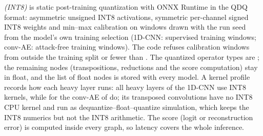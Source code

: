 \emph{\Qint{} (INT8)} is static post-training quantization with ONNX Runtime in the QDQ format: asymmetric unsigned INT8
activations, symmetric per-channel signed INT8 weights and min--max calibration on \CalibWindowsQ{} windows drawn with
the run seed from the model's own training selection (1D-CNN: supervised training windows; conv-AE: attack-free
training windows). The code refuses calibration windows from outside the training split or fewer than
\MinCalibWindowsQ. The quantized operator types are \QOpTypes; the remaining nodes (transpositions, reductions and
the score computation) stay in float, and the list of float nodes is stored with every model. A kernel profile
records how each heavy layer runs: all \HeavyIntCNN{} heavy layers of the 1D-CNN use INT8 kernels, while for the
conv-AE \HeavyIntAE{} of \HeavyAE{} do; its \HeavySimAE{} transposed convolutions have no INT8 CPU kernel and run as
dequantize--float--quantize simulation, which keeps the INT8 numerics but not the INT8 arithmetic. The score (logit
or reconstruction error) is computed inside every graph, so latency covers the whole inference.
